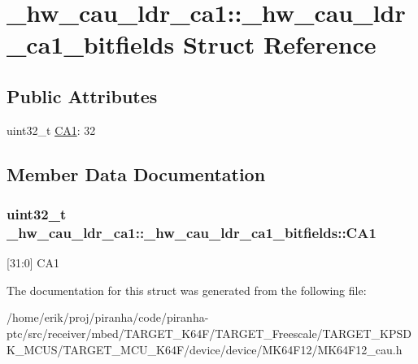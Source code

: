 \hypertarget{struct__hw__cau__ldr__ca1_1_1__hw__cau__ldr__ca1__bitfields}{}\section{\+\_\+hw\+\_\+cau\+\_\+ldr\+\_\+ca1\+:\+:\+\_\+hw\+\_\+cau\+\_\+ldr\+\_\+ca1\+\_\+bitfields Struct Reference}
\label{struct__hw__cau__ldr__ca1_1_1__hw__cau__ldr__ca1__bitfields}
\subsection*{Public Attributes}
\begin{DoxyCompactItemize}
\item 
uint32\+\_\+t \hyperlink{struct__hw__cau__ldr__ca1_1_1__hw__cau__ldr__ca1__bitfields_af08f0bb7772a4e61352e2806e34ea5f2}{C\+A1}\+: 32
\end{DoxyCompactItemize}


\subsection{Member Data Documentation}
\subsubsection[{\texorpdfstring{C\+A1}{CA1}}]{\setlength{\rightskip}{0pt plus 5cm}uint32\+\_\+t \+\_\+hw\+\_\+cau\+\_\+ldr\+\_\+ca1\+::\+\_\+hw\+\_\+cau\+\_\+ldr\+\_\+ca1\+\_\+bitfields\+::\+C\+A1}\hypertarget{struct__hw__cau__ldr__ca1_1_1__hw__cau__ldr__ca1__bitfields_af08f0bb7772a4e61352e2806e34ea5f2}{}\label{struct__hw__cau__ldr__ca1_1_1__hw__cau__ldr__ca1__bitfields_af08f0bb7772a4e61352e2806e34ea5f2}
\mbox{[}31\+:0\mbox{]} C\+A1 

The documentation for this struct was generated from the following file\+:\begin{DoxyCompactItemize}
\item 
/home/erik/proj/piranha/code/piranha-\/ptc/src/receiver/mbed/\+T\+A\+R\+G\+E\+T\+\_\+\+K64\+F/\+T\+A\+R\+G\+E\+T\+\_\+\+Freescale/\+T\+A\+R\+G\+E\+T\+\_\+\+K\+P\+S\+D\+K\+\_\+\+M\+C\+U\+S/\+T\+A\+R\+G\+E\+T\+\_\+\+M\+C\+U\+\_\+\+K64\+F/device/device/\+M\+K64\+F12/M\+K64\+F12\+\_\+cau.\+h\end{DoxyCompactItemize}
